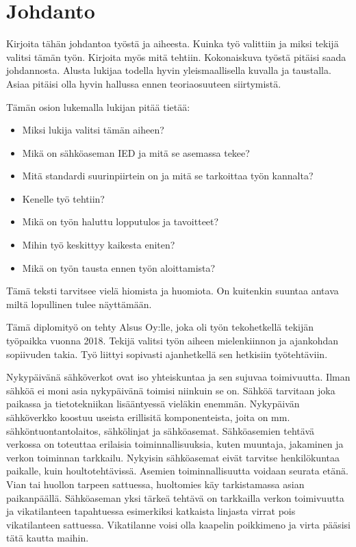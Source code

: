 \chapter{Johdanto}
\label{ch:johdanto}
\begin{it}
	Kirjoita tähän johdantoa työstä ja aiheesta. Kuinka työ valittiin ja miksi tekijä valitsi tämän työn. Kirjoita myös mitä tehtiin. Kokonaiskuva työstä pitäisi saada johdannosta. Alusta lukijaa todella hyvin yleismaallisella kuvalla ja taustalla. Asiaa pitäisi olla hyvin hallussa ennen teoriaosuuteen siirtymistä.
	
	Tämän osion lukemalla lukijan pitää tietää:
	\begin{itemize}
		\item Miksi lukija valitsi tämän aiheen?
		\item Mikä on sähköaseman IED ja mitä se asemassa tekee?
		\item Mitä standardi suurinpiirtein on ja mitä se tarkoittaa työn kannalta?
		\item Kenelle työ tehtiin?
		\item Mikä on työn haluttu lopputulos ja tavoitteet?
		\item Mihin työ keskittyy kaikesta eniten?
		\item Mikä on työn tausta ennen työn aloittamista?
	\end{itemize}
	
	Tämä teksti tarvitsee vielä hiomista ja huomiota. On kuitenkin suuntaa antava miltä lopullinen tulee näyttämään.
\end{it}

Tämä diplomityö on tehty Alsus Oy:lle, joka oli työn tekohetkellä tekijän työpaikka vuonna 2018. Tekijä valitsi työn aiheen mielenkiinnon ja ajankohdan sopiivuden takia. Työ liittyi sopivasti ajanhetkellä sen hetkisiin työtehtäviin.

Nykypäivänä sähköverkot ovat iso yhteiskuntaa ja sen sujuvaa toimivuutta. Ilman sähköä ei moni asia nykypäivänä toimisi niinkuin se on. Sähköä tarvitaan joka paikassa ja tietotekniikan lisääntyessä vieläkin enemmän. Nykypäivän sähköverkko koostuu useista erillisitä komponenteista, joita on mm. sähköntuontantolaitos, sähkölinjat ja sähköasemat. Sähköasemien tehtävä verkossa on toteuttaa erilaisia toiminnallisuuksia, kuten muuntaja, jakaminen ja verkon toiminnan tarkkailu. Nykyisin sähköasemat eivät tarvitse henkilökuntaa paikalle, kuin houltotehtävissä. Asemien toiminnallisuutta voidaan seurata etänä. Vian tai huollon tarpeen sattuessa, huoltomies käy tarkistamassa asian paikanpäällä. Sähköaseman yksi tärkeä tehtävä on tarkkailla verkon toimivuutta ja vikatilanteen tapahtuessa esimerkiksi katkaista linjasta virrat pois vikatilanteen sattuessa. Vikatilanne voisi olla kaapelin poikkimeno ja virta pääsisi tätä kautta maihin.

